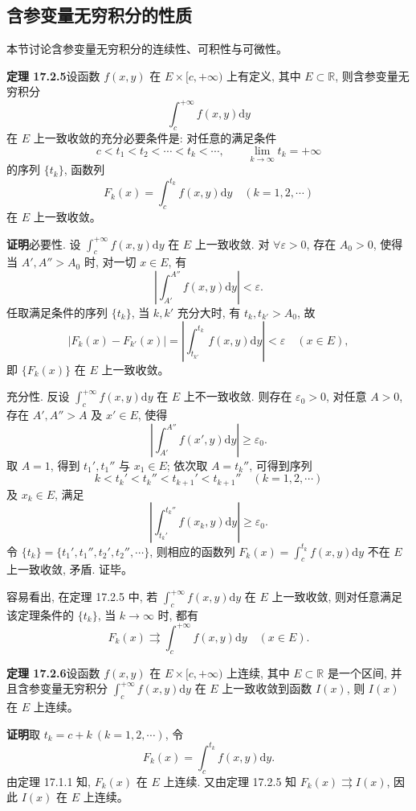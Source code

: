\documentclass[UTF8,12pt,a4paper,fontset=fandol]{ctexart}
\begin{document}
\subsection{含参变量无穷积分的性质}

本节讨论含参变量无穷积分的连续性、可积性与可微性。

\noindent\textbf{定理 17.2.5}\quad 设函数 $f(x,y)$ 在 $E\times[c,+\infty)$ 上有定义, 其中 $E\subset\mathbb R$, 则含参变量无穷积分
\[
  \int_c^{+\infty}f(x,y)\mathrm dy
\]
在 $E$ 上一致收敛的充分必要条件是: 对任意的满足条件
\[
  c<t_1<t_2<\cdots<t_k<\cdots,\qquad \lim_{k\to\infty}t_k=+\infty
\]
的序列 $\{t_k\}$, 函数列
\[
  F_k(x)=\int_c^{t_k}f(x,y)\mathrm dy\quad(k=1,2,\cdots)
\]
在 $E$ 上一致收敛。

\noindent\textbf{证明}\quad 必要性. 设 $\int_c^{+\infty}f(x,y)\mathrm dy$ 在 $E$ 上一致收敛. 对 $\forall\varepsilon>0$, 存在 $A_0>0$, 使得当 $A',A''>A_0$ 时, 对一切 $x\in E$, 有
\[
  \left|\int_{A'}^{A''}f(x,y)\mathrm dy\right|<\varepsilon.
\]
任取满足条件的序列 $\{t_k\}$, 当 $k,k'$ 充分大时, 有 $t_k,t_{k'}>A_0$, 故
\[
  |F_k(x)-F_{k'}(x)|
  =\left|\int_{t_{k'}}^{t_k}f(x,y)\mathrm dy\right|<\varepsilon
  \quad(x\in E),
\]
即 $\{F_k(x)\}$ 在 $E$ 上一致收敛。

充分性. 反设 $\int_c^{+\infty}f(x,y)\mathrm dy$ 在 $E$ 上不一致收敛. 则存在 $\varepsilon_0>0$, 对任意 $A>0$, 存在 $A',A''>A$ 及 $x'\in E$, 使得
\[
  \left|\int_{A'}^{A''}f(x',y)\mathrm dy\right|\geqslant\varepsilon_0.
\]
取 $A=1$, 得到 $t_1',t_1''$ 与 $x_1\in E$; 依次取 $A=t_k''$, 可得到序列
\[
  k<t_k'<t_k''<t_{k+1}'<t_{k+1}''\quad(k=1,2,\cdots)
\]
及 $x_k\in E$, 满足
\[
  \left|\int_{t_k'}^{t_k''}f(x_k,y)\mathrm dy\right|\geqslant\varepsilon_0.
\]
令 $\{t_k\}=\{t_1',t_1'',t_2',t_2'',\cdots\}$, 则相应的函数列 $F_k(x)=\int_c^{t_k}f(x,y)\mathrm dy$ 不在 $E$ 上一致收敛, 矛盾. 证毕。

容易看出, 在定理 17.2.5 中, 若 $\int_c^{+\infty}f(x,y)\mathrm dy$ 在 $E$ 上一致收敛, 则对任意满足该定理条件的 $\{t_k\}$, 当 $k\to\infty$ 时, 都有
\[
  F_k(x)\rightrightarrows \int_c^{+\infty}f(x,y)\mathrm dy\quad(x\in E).
\]

\noindent\textbf{定理 17.2.6}\quad 设函数 $f(x,y)$ 在 $E\times[c,+\infty)$ 上连续, 其中 $E\subset\mathbb R$ 是一个区间, 并且含参变量无穷积分 $\int_c^{+\infty}f(x,y)\mathrm dy$ 在 $E$ 上一致收敛到函数 $I(x)$, 则 $I(x)$ 在 $E$ 上连续。

\noindent\textbf{证明}\quad 取 $t_k=c+k\ (k=1,2,\cdots)$, 令
\[
  F_k(x)=\int_c^{t_k}f(x,y)\mathrm dy.
\]
由定理 17.1.1 知, $F_k(x)$ 在 $E$ 上连续. 又由定理 17.2.5 知 $F_k(x)\rightrightarrows I(x)$, 因此 $I(x)$ 在 $E$ 上连续。
\end{document}

